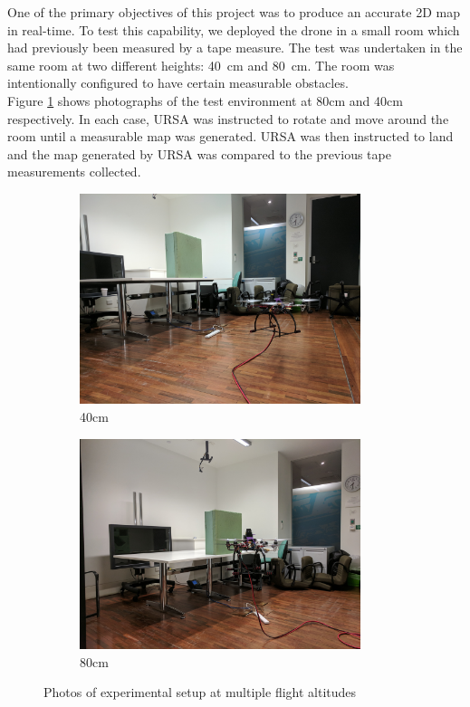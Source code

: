 \documentclass[capstone_report.tex]{subfiles}
\begin{document}
One of the primary objectives of this project was to produce an accurate 2D map in real-time.  To test this capability, we deployed the drone in a small room which had previously been measured by a tape measure. The test was undertaken in the same room at two different heights: \SI{40}{\centi\metre} and \SI{80}{\centi\metre}. The room was intentionally configured to have certain measurable obstacles.\\

Figure \ref{fig:map_env_imgs} shows photographs of the test environment at 80cm and 40cm respectively. In each case, URSA was instructed to rotate and move around the room until a measurable map was generated. URSA was then instructed to land and the map generated by URSA was compared to the previous tape measurements collected.\\

\begin{figure}[H]
    \centering
    \begin{subfigure}{0.5\textwidth}
        \centering
        \includegraphics[width=0.9\textwidth]{./imgs/mapping/img_40cm.jpg}
        \caption{40cm}
    \end{subfigure}%
    \begin{subfigure}{0.5\textwidth}
        \centering
        \includegraphics[width=0.9\textwidth]{./imgs/mapping/img_80cm.jpg}
        \caption{80cm}
    \end{subfigure}
    \caption{Photos of experimental setup at multiple flight altitudes}
    \label{fig:map_env_imgs}
\end{figure}
\end{document}
